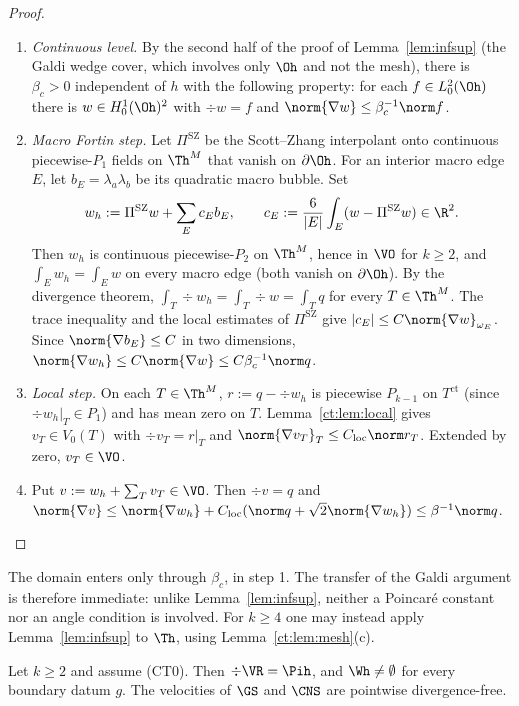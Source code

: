 \begin{proof}
\begin{enumerate}
\item \emph{Continuous level.} By the second half of the proof of Lemma~\ref{lem:infsup} (the Galdi wedge cover, which involves only $\Oh$ and not the mesh), there is $\beta_c>0$ independent of $h$ with the following property: for each $f\in L^2_0(\Oh)$ there is $w\in H^1_0(\Oh)^2$ with $\div w=f$ and $\norm{\nabla w}\le\beta_c^{-1}\norm f$.
\item \emph{Macro Fortin step.} Let $\Pi^{\mathrm{SZ}}$ be the Scott--Zhang interpolant \cite{ScottZhang1990} onto continuous piecewise-$P_1$ fields on $\Th^M$ that vanish on $\partial\Oh$. For an interior macro edge $E$, let $b_E=\lambda_a\lambda_b$ be its quadratic macro bubble. Set
\[
w_h:=\Pi^{\mathrm{SZ}}w+\sum_{E}c_Eb_E,\qquad c_E:=\frac{6}{|E|}\int_E(w-\Pi^{\mathrm{SZ}}w)\in\R^2 .
\]
Then $w_h$ is continuous piecewise-$P_2$ on $\Th^M$, hence in $\VO$ for $k\ge2$, and $\int_Ew_h=\int_Ew$ on every macro edge (both vanish on $\partial\Oh$). By the divergence theorem, $\int_T\div w_h=\int_T\div w=\int_Tq$ for every $T\in\Th^M$. The trace inequality and the local estimates of $\Pi^{\mathrm{SZ}}$ give $|c_E|\le C\norm{\nabla w}_{\omega_E}$. Since $\norm{\nabla b_E}\le C$ in two dimensions, $\norm{\nabla w_h}\le C\norm{\nabla w}\le C\beta_c^{-1}\norm q$.
\item \emph{Local step.} On each $T\in\Th^M$, $r:=q-\div w_h$ is piecewise $P_{k-1}$ on $T^{\mathrm{ct}}$ (since $\div w_h|_T\in P_1$) and has mean zero on $T$. Lemma~\ref{ct:lem:local} gives $v_T\in V_0(T)$ with $\div v_T=r|_T$ and $\norm{\nabla v_T}_T\le C_{\mathrm{loc}}\norm r_T$. Extended by zero, $v_T\in\VO$.
\item Put $v:=w_h+\sum_Tv_T\in\VO$. Then $\div v=q$ and $\norm{\nabla v}\le\norm{\nabla w_h}+C_{\mathrm{loc}}(\norm q+\sqrt2\norm{\nabla w_h})\le\beta^{-1}\norm q$.\qedhere
\end{enumerate}
\end{proof}

The domain enters only through $\beta_c$, in step 1. The transfer of the Galdi argument is therefore immediate: unlike Lemma~\ref{lem:infsup}, neither a Poincar\'e constant nor an angle condition is involved. For $k\ge4$ one may instead apply Lemma~\ref{lem:infsup} to $\Th$, using Lemma~\ref{ct:lem:mesh}(c).

\begin{lemma}\label{ct:lem:divrange}
Let $k\ge2$ and assume (CT0). Then $\div\VR=\Pih$, and $\Wh\ne\emptyset$ for every boundary datum $g$. The velocities of $\GS$ and $\CNS$ are pointwise divergence-free.
\end{lemma}

